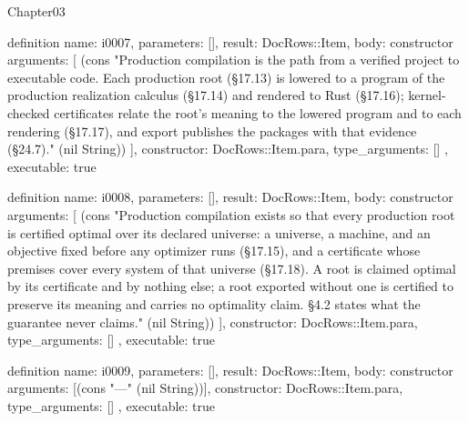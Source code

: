 \begin{lexlean}{Chapter03}
\begin{semanticmodule}
definition{
  name: i0007,
  parameters: [],
  result: DocRows::Item,
  body: constructor{
    arguments: [
      (cons "Production compilation is the path from a verified project to executable code. Each production root (§17.13) is lowered to a program of the production realization calculus (§17.14) and rendered to Rust (§17.16); kernel-checked certificates relate the root's meaning to the lowered program and to each rendering (§17.17), and export publishes the packages with that evidence (§24.7)." (nil String))
    ],
    constructor: DocRows::Item.para,
    type_arguments: []
  },
  executable: true
}

definition{
  name: i0008,
  parameters: [],
  result: DocRows::Item,
  body: constructor{
    arguments: [
      (cons "Production compilation exists so that every production root is certified optimal over its declared universe: a universe, a machine, and an objective fixed before any optimizer runs (§17.15), and a certificate whose premises cover every system of that universe (§17.18). A root is claimed optimal by its certificate and by nothing else; a root exported without one is certified to preserve its meaning and carries no optimality claim. §4.2 states what the guarantee never claims." (nil String))
    ],
    constructor: DocRows::Item.para,
    type_arguments: []
  },
  executable: true
}

definition{
  name: i0009,
  parameters: [],
  result: DocRows::Item,
  body: constructor{
    arguments: [(cons "---" (nil String))],
    constructor: DocRows::Item.para,
    type_arguments: []
  },
  executable: true
}
\end{semanticmodule}
\end{lexlean}

